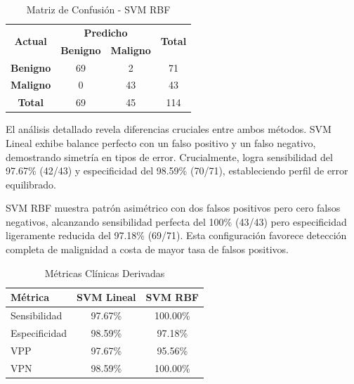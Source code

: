 \documentclass[conference]{IEEEtran}
\begin{document}
\begin{table}[htbp]
\caption{Matriz de Confusión - SVM RBF}
\begin{center}
\footnotesize
\begin{tabular}{|c|c|c|c|}
\hline
\multirow{2}{*}{\textbf{Actual}} & \multicolumn{2}{c|}{\textbf{Predicho}} & \multirow{2}{*}{\textbf{Total}} \\
\cline{2-3}
 & \textbf{Benigno} & \textbf{Maligno} & \\
\hline
\textbf{Benigno} & 69 & 2 & 71 \\
\hline
\textbf{Maligno} & 0 & 43 & 43 \\
\hline
\textbf{Total} & 69 & 45 & 114 \\
\hline
\end{tabular}
\label{tab6}
\end{center}
\end{table}

El análisis detallado revela diferencias cruciales entre ambos métodos. SVM Lineal exhibe balance perfecto con un falso positivo y un falso negativo, demostrando simetría en tipos de error. Crucialmente, logra sensibilidad del 97.67\% (42/43) y especificidad del 98.59\% (70/71), estableciendo perfil de error equilibrado.

SVM RBF muestra patrón asimétrico con dos falsos positivos pero cero falsos negativos, alcanzando sensibilidad perfecta del 100\% (43/43) pero especificidad ligeramente reducida del 97.18\% (69/71). Esta configuración favorece detección completa de malignidad a costa de mayor tasa de falsos positivos.

\begin{table}[htbp]
\caption{Métricas Clínicas Derivadas}
\begin{center}
\footnotesize
\begin{tabular}{|l|c|c|}
\hline
\textbf{Métrica} & \textbf{SVM Lineal} & \textbf{SVM RBF} \\
\hline
Sensibilidad & 97.67\% & 100.00\% \\
\hline
Especificidad & 98.59\% & 97.18\% \\
\hline
VPP & 97.67\% & 95.56\% \\
\hline
VPN & 98.59\% & 100.00\% \\
\hline
\end{tabular}
\label{tab7}
\end{center}
\end{table}
\end{document}
